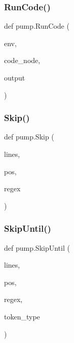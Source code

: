 \mbox{\label{namespacepump_ac6a714a44e28c2a19a1dfabeb9c9d4f1}} 
\subsubsection{\texorpdfstring{RunCode()}{RunCode()}}
{\footnotesize\ttfamily def pump.\+Run\+Code (\begin{DoxyParamCaption}\item[{}]{env,  }\item[{}]{code\+\_\+node,  }\item[{}]{output }\end{DoxyParamCaption})}

\mbox{\label{namespacepump_a869bd8932d9ee97f3a0e789abd05d590}} 
\subsubsection{\texorpdfstring{Skip()}{Skip()}}
{\footnotesize\ttfamily def pump.\+Skip (\begin{DoxyParamCaption}\item[{}]{lines,  }\item[{}]{pos,  }\item[{}]{regex }\end{DoxyParamCaption})}

\mbox{\label{namespacepump_a8935d04d89047866b07c59845e2d7d29}} 
\subsubsection{\texorpdfstring{SkipUntil()}{SkipUntil()}}
{\footnotesize\ttfamily def pump.\+Skip\+Until (\begin{DoxyParamCaption}\item[{}]{lines,  }\item[{}]{pos,  }\item[{}]{regex,  }\item[{}]{token\+\_\+type }\end{DoxyParamCaption})}

\mbox{\label{namespacepump_a9353db466a97e632058887a77c3b26aa}} 
